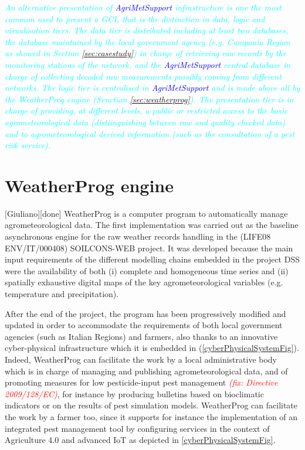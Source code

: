 \documentclass[authoryear,preprint,review,12pt]{elsarticle}
\newcommand{\note}[1]{\emph{\textcolor{red}{#1}}}
\newcommand{\update}[1]{\emph{\textcolor{blue}{#1}}}
\newcommand{\review}[1]{\emph{\textcolor{cyan}{#1}}}
\newcommand{\gci}{\update{AgriMetSupport}\xspace}
\begin{document}
\review{An alternative presentation of \gci infrastructure is one the most common used to present a GCI, that is the distinction in data, logic and visualisation tiers. The data tier is distributed including at least two databases, the database maintained by the local government agency (e.g. Campania Region as showed in Section \ref{sec:casestudy}) in charge of retrieving raw records by the monitoring stations of the network, and the \gci central database in charge of collecting decoded raw measurements possibly coming from different networks. The logic tier is centralised in \gci and is made above all by the WeatherProg engine (Senction \ref{sec:weatherprog}). The presentation tier is in charge of providing, at different levels, a public or restricted access to the basic agrometeorological data (distiinguishing between raw and quality checked data) and to agrometeorological derived information (such as the consultation of a pest risk service). }

\section{WeatherProg engine}[Giuliano][done] \label{sec:weatherprog}
WeatherProg \citep{langella:weatherprog2014} is a computer program to automatically manage agrometeorological data.
The first implementation was carried out as the baseline asynchronous engine for the raw weather records handling in the (LIFE08 ENV/IT/000408) SOILCONS-WEB project.
It was developed because the main input requirements of the different modelling chains embedded in the project DSS \citep{Terribile:soilconsweb:2015} were the availability of both (i) complete and homogeneous time series and (ii) spatially exhaustive digital maps of the key agrometeorological variables (e.g. temperature and precipitation).

After the end of the project, the program has been progressively modified and updated in order to accommodate the requirements of both local government agencies (such as Italian Regions) and farmers, also thanks to an innovative cyber-physical infrastructure which it is embedded in (\cref{cyberPhysicalSystemFig}).
Indeed, WeatherProg can facilitate the work by a local administrative body which is in charge of managing and publishing agrometeorological data, and of promoting measures for low pesticide-input pest management \note{(fix: Directive 2009/128/EC)\citep{eu:dir128:2009}}, for instance by producing bulletins based on bioclimatic indicators or on the results of pest simulation models.
WeatherProg can facilitate the work by a farmer too, since it supports for instance the implementation of an integrated pest management tool \citep{Terribile:dssvitis:2017} by configuring services in the context of Agriculture 4.0 and advanced IoT as depicted in \cref{cyberPhysicalSystemFig}.
\end{document}
